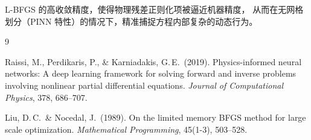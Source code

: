 \documentclass[UTF8, 12pt]{ctexart}
\begin{document}
L-BFGS 的高收敛精度，使得物理残差正则化项被逼近机器精度，
从而在无网格划分（PINN 特性）的情况下，精准捕捉方程内部复杂的动态行为。






\begin{thebibliography}{9}

Raissi, M., Perdikaris, P., \& Karniadakis, G.\,E.\ (2019).
Physics-informed neural networks: A deep learning framework for solving forward and inverse problems involving nonlinear partial differential equations.
\textit{Journal of Computational Physics}, 378, 686--707.

Liu, D.\,C.\ \& Nocedal, J.\ (1989).
On the limited memory BFGS method for large scale optimization.
\textit{Mathematical Programming}, 45(1-3), 503--528.

\end{thebibliography}
\end{document}
